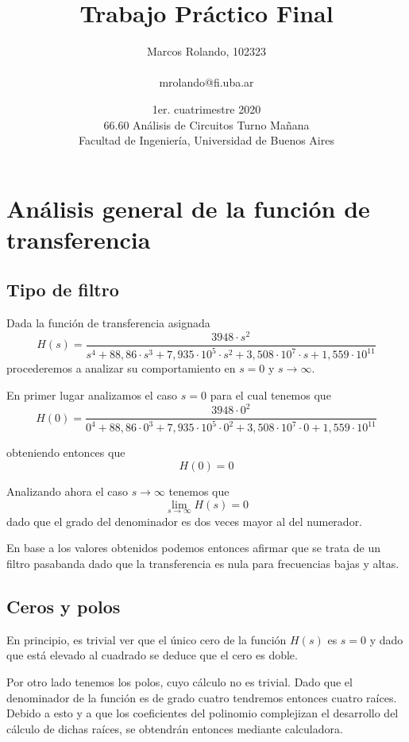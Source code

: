 \documentclass[11pt,a4paper]{report}
\author{\centerline{Marcos Rolando, 102323}\\
  {mrolando@fi.uba.ar}}
\date{1er. cuatrimestre 2020
    \\66.60 Análisis de Circuitos Turno Mañana
    \\Facultad de Ingeniería, Universidad de Buenos Aires}
\title{Trabajo Práctico Final}
\begin{document}


\maketitle{}

\printindex

\section*{Análisis general de la función de transferencia}
\subsection*{Tipo de filtro}

Dada la función de transferencia asignada
\[H(s)=\frac{3948 \cdot s^2}{s^4+88,86 \cdot s^3+7,935 \cdot 10^5 \cdot s^2+3,508 \cdot 10^7 \cdot s+1,559 \cdot 10^{11}}\]
procederemos a analizar su comportamiento en $s=0$ y $s\longrightarrow\infty$.

\bigskip
En primer lugar analizamos el caso $s=0$ para el cual tenemos que 
\[H(0) = \frac{3948 \cdot 0^2}{0^4+88,86 \cdot 0^3+7,935 \cdot 10^5 \cdot 0^2+3,508 \cdot 10^7 \cdot 0+1,559 \cdot 10^{11}}\]

obteniendo entonces que
\[H(0) = 0\]

Analizando ahora el caso $s\longrightarrow\infty$ tenemos que
\[\lim_{s \to \infty} H(s) = 0\]
dado que el grado del denominador es dos veces mayor al del numerador.

\bigskip
En base a los valores obtenidos podemos entonces afirmar que se trata de un
filtro pasabanda dado que la transferencia es nula para frecuencias bajas y altas.

\subsection*{Ceros y polos}
En principio, es trivial ver que el único cero de la función $H(s)$ es
$s = 0$ y dado que está elevado al cuadrado se deduce que el cero es doble.

\bigskip
Por otro lado tenemos los polos, cuyo cálculo no es trivial. Dado que el denominador de la función es de grado cuatro tendremos entonces cuatro raíces. Debido a esto
y a que los coeficientes del polinomio complejizan el desarrollo del cálculo de 
dichas raíces, se obtendrán entonces mediante calculadora. 
\end{document}
